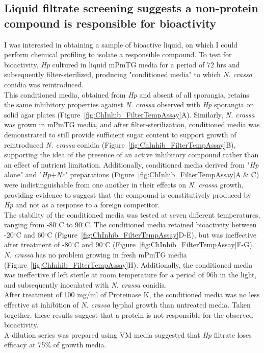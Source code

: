 \subsection*{Liquid filtrate screening suggests a non-protein compound is responsible for bioactivity}
I was interested in obtaining a sample of bioactive liquid, on which I could perform chemical profiling to isolate a responsible compound. To test for bioactivity, \textit{Hp} cultured in liquid mPmTG media for a period of 72 hrs and subsequently filter-sterilized, producing "conditioned media" to which \textit{N. crassa} conidia was reintroduced. \\
\indent This conditioned media, obtained from \textit{Hp} and absent of all sporangia, retains the same inhibitory properties against \textit{N. crassa} observed with \textit{Hp} sporangia on solid agar plates (Figure~\ref{fig:ChInhib_FilterTempAssay}A). Similarly, \textit{N. crassa} was grown in mPmTG media, and after filter-sterilization, conditioned media was demonstrated to still provide sufficient sugar content to support growth of reintroduced \textit{N. crassa} conidia (Figure~\ref{fig:ChInhib_FilterTempAssay}B), supporting the idea of the presence of an active inhibitory compound rather than an effect of nutrient limitation. Additionally, conditioned media derived from "\textit{Hp} alone" and "\textit{Hp}+\textit{Nc}" preparations (Figure~\ref{fig:ChInhib_FilterTempAssay}A \& C) were indistinguishable from one another in their effects on \textit{N. crassa} growth, providing evidence to suggest that the compound is constitutively produced by \textit{Hp} and not as a response to a foreign competitor. \\
\indent The stability of the conditioned media was tested at seven different temperatures, ranging from -80$^{\circ}$C to 90$^{\circ}$C. The conditioned media retained bioactivity between -20$^{\circ}$C and 60$^{\circ}$C (Figure~\ref{fig:ChInhib_FilterTempAssay}D-E), but was ineffective after treatment of -80$^{\circ}$C and 90$^{\circ}$C (Figure~\ref{fig:ChInhib_FilterTempAssay}F-G). \textit{N. crassa} has no problem growing in fresh mPmTG media (Figure~\ref{fig:ChInhib_FilterTempAssay}H). Additionally, the conditioned media was ineffective if left sterile at room temperature for a period of 96h in the light, and subsequently inoculated with \textit{N. crassa} conidia.\\
\indent After treatment of 100 mg/ml of Proteinase K, the conditioned media was no less effective at inhibition of \textit{N. crassa} hyphal growth than untreated media. Taken together, these results suggest that a protein is not responsible for the observed bioactivity.\\
\indent A dilution series was prepared using VM media suggested that \textit{Hp} filtrate loses efficacy at 75\% of growth media.\\

